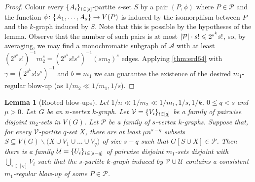 \documentclass[12pt,reqno]{amsart}
\theoremstyle{plain}
\newtheorem{lemma}[theorem]{Lemma}
\theoremstyle{definition}
\numberwithin{equation}{section}
\DeclarePairedDelimiter{\abs}{\lvert}{\rvert}
\DeclarePairedDelimiter{\set}{\{}{\}}
\renewcommand{\leq}{\leqslant}
\renewcommand{\setminus}{\smallsetminus}
\newcommand{\cP}{\mathcal{P}}
\newcommand{\cU}{\mathcal{U}}
\newcommand{\cV}{\mathcal{V}}
\begin{document}
	\begin{proof}
		Colour every $\set{A_i}_{i \in [s]}$-partite $s$-set $S$ by a pair $(P, \phi)$ where $P \in \cP$ and the function $\phi \colon \set{A_1, \dotsc, A_s} \to V(P)$ is induced by the isomorphism between $P$ and the $k$-graph induced by $S$. Note that this is possible by the hypotheses of the lemma. Observe that the number of such pairs is at most $\abs{\cP} \cdot s! \leq 2^{s^k}s!$, so, by averaging, we may find a monochromatic subgraph of $\mathcal{A}$ with at least $(2^{s^k}s!)^{-1} m_2^{s} = (2^{s^k} s! s^s)^{-1} (s m_2)^{s}$ edges. Applying \cref{thm:erd64} with $\gamma = (2^{s^k} s! s^s)^{-1}$ and $b = m_1$ we can guarantee the existence of the desired $m_1$-regular blow-up (as $1/m_2\ll 1/m_1, 1/s$).
	\end{proof}
	
	\begin{lemma}[Rooted blow-ups]\label{lem:rooted-blow-ups}
		Let $1/n \ll 1/m_2 \ll 1/m_1, 1/s,1/k$, $0 \leq q < s$ and $\mu>0$.
		Let~$G$ be an $n$-vertex $k$-graph.
		Let $\cV = \set{V_i}_{i \in [q]}$ be a family of pairwise disjoint $m_2$-sets in $V(G)$.
		Let $\cP$ be a family of $s$-vertex $k$-graphs.
		Suppose that, for every $\cV$-partite $q$-set $X$, there are at least $\mu n^{s - q}$ subsets $S \subseteq V(G) \setminus \big(X \cup V_1 \cup \dots \cup V_q\big)$ of size $s - q$ such that $G[S \cup X] \in \cP$.
		Then there is a family $\cU = \set{U_i}_{i \in [s - q]}$ of pairwise disjoint $m_1$-sets disjoint with $\bigcup_{i\in[q]} V_i$ such that the $s$-partite $k$-graph induced by $\cV \cup \cU$ contains a consistent $m_1$-regular blow-up of some $P\in \cP$.
	\end{lemma}
	
\end{document}

